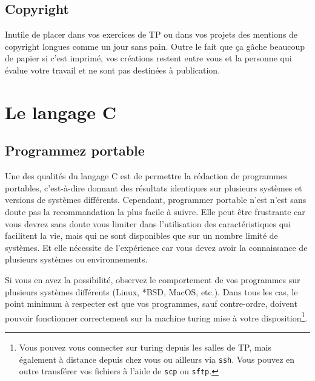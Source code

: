 \documentclass {article}
\begin{document}
\subsection {Copyright}

Inutile de placer dans vos exercices de TP ou dans vos projets des
mentions de copyright longues comme un jour sans pain. Outre le fait
que ça gâche beaucoup de papier si c'est imprimé, vos créations
restent entre vous et la personne qui évalue votre travail et ne sont
pas destinées à publication.


% 
% 


\section {Le langage C}

\subsection {Programmez portable}

Une des qualités du langage C est de permettre la rédaction de
programmes portables, c'est-à-dire donnant des résultats identiques
sur plusieurs systèmes et versions de systèmes différents. Cependant,
programmer portable n'est n'est sans doute pas la recommandation la plus
facile à suivre. Elle peut être frustrante car vous devrez sans doute
vous limiter dans l'utilisation des caractéristiques qui facilitent
la vie, mais qui ne sont disponibles que sur un nombre limité de
systèmes. Et elle nécessite de l'expérience car vous devez avoir la
connaissance de plusieurs systèmes ou environnements.

Si vous en avez la possibilité, observez le comportement de vos
programmes sur plusieurs systèmes différents (Linux, *BSD, MacOS, etc.).
Dans tous les cas, le point minimum à respecter est que vos programmes,
sauf contre-ordre, doivent pouvoir fonctionner correctement sur la machine
turing mise à votre disposition\footnote {Vous pouvez vous connecter
sur turing depuis les salles de TP, mais également à distance depuis
chez vous ou ailleurs via \texttt {ssh}. Vous pouvez en outre transférer
vos fichiers à l'aide de \texttt {scp} ou \texttt {sftp}.}.
\end{document}
